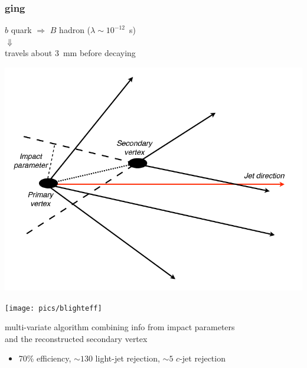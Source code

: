 \begin{frame}\frametitle{\btag ging}
\centering\footnotesize

\begin{minipage}{.5\textwidth}\centering

$b$ quark $\Rightarrow$ $B$ hadron ($\lambda\sim 10^{-12}$~s)\\
{\large$\Downarrow$}\\
travels about 3~mm before decaying

\includegraphics[width=.5\textwidth]{../objectsreconstruction/figures/Picture-b-tagging-2.png}

\end{minipage}\begin{minipage}{.5\textwidth}\centering

\texttt{[image: pics/blighteff]}

\end{minipage}

\myskip


multi-variate algorithm combining info from {\cccolor impact parameters}\\
and the {\cccolor reconstructed secondary vertex} 

\begin{itemize}
\item 70\% efficiency, $\sim 130$ light-jet rejection, $\sim 5$ $c$-jet rejection
\end{itemize}

\end{frame}



